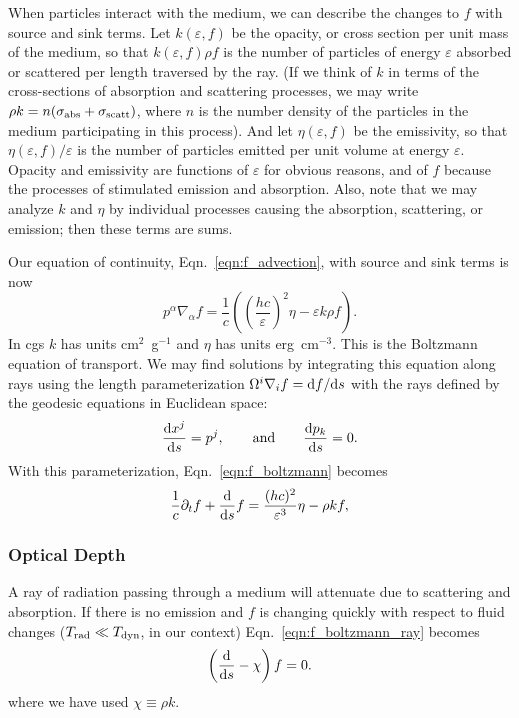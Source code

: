 When particles interact with the medium, we can describe the changes to $f$ with
source and sink terms.
Let $k(\varepsilon,f)$ be the opacity, or cross section per unit mass of the
medium, so that $k(\varepsilon,f)\rho f$ is the number of particles of energy
$\varepsilon$ absorbed or scattered per length traversed by the ray.
(If we think of $k$ in terms of the cross-sections of absorption and scattering
processes, we may write $\rho k = n(\sigma_{\rm abs}+\sigma_{\rm scatt})$, where
$n$ is the number density of the particles in the medium participating in this
process).
And let $\eta(\varepsilon,f)$ be the emissivity, so that
$\eta(\varepsilon,f)/\varepsilon$ is the number of particles emitted per
unit volume at energy $\varepsilon$.
Opacity and emissivity are functions of $\varepsilon$ for obvious reasons, and
of $f$ because the processes of stimulated emission and absorption.
Also, note that we may analyze $k$ and $\eta$ by individual processes causing the
absorption, scattering, or emission; then these terms are sums.

Our equation of continuity, Eqn.~\ref{eqn:f_advection},
with source and sink terms is now
\begin{equation}
  \label{eqn:f_boltzmann}
  p^\alpha\nabla_\alpha f = \frac{1}{c}
  \left( \left(\frac{hc}{\varepsilon}\right)^2\eta - \varepsilon k \rho f\right).
\end{equation}
In cgs $k$ has units cm$^2$~g$^{-1}$ and $\eta$ has units erg~cm$^{-3}$.
This is the Boltzmann equation of transport.
We may find solutions by integrating this equation along rays using the length
parameterization $\Omega^i\nabla_i f=\mathrm{d} f/\mathrm{d} s$ with the rays defined by
the geodesic equations in Euclidean space:
\begin{equation}
  \label{eqn:geo_straight_ray}
  \frac{\mathrm{d} x^j}{\mathrm{d} s}=p^j, \qquad {\rm and} \qquad
  \frac{\mathrm{d} p_k}{\mathrm{d} s}=0.
\end{equation}
With this parameterization, Eqn.~\ref{eqn:f_boltzmann} becomes
\begin{equation}
  \label{eqn:f_boltzmann_ray}
  \frac{1}{c} \partial_t f + \frac{\mathrm{d}}{\mathrm{d} s} f =
  \frac{(hc)^2}{\varepsilon^3}\eta - \rho k f,
\end{equation}

\subsubsection{Optical Depth}
A ray of radiation passing through a medium will attenuate due to scattering and
absorption. If there is no emission and $f$ is changing quickly with respect to
fluid changes ($T_{\rm rad} \ll T_{\rm dyn}$, in our context)
Eqn.~\ref{eqn:f_boltzmann_ray} becomes
\begin{equation}
  \left(\frac{\mathrm{d}}{\mathrm{d} s} - \chi\right)f=0.
\end{equation}
where we have used $\chi\equiv\rho k$.

